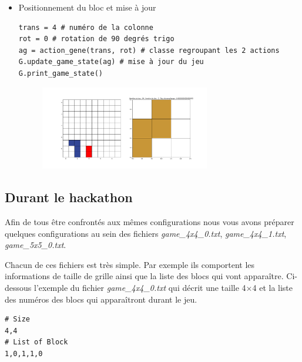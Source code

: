 \documentclass[10pt,a4paper]{article}
\begin{document}
\begin{itemize}
\item Positionnement du bloc et mise à jour
\begin{verbatim}
trans = 4 # numéro de la colonne
rot = 0 # rotation de 90 degrés trigo
ag = action_gene(trans, rot) # classe regroupant les 2 actions
G.update_game_state(ag) # mise à jour du jeu
G.print_game_state()
\end{verbatim}
\begin{figure}[ht!]
	\centering
	\includegraphics[width=0.7\textwidth]{update_game_2.pdf}
\end{figure}

\end{itemize}

\subsection*{Durant le hackathon}

Afin de tous être confrontés aux mêmes configurations nous vous avons préparer quelques configurations au sein des fichiers \textit{game\_4x4\_0.txt}, \textit{game\_4x4\_1.txt}, \textit{game\_5x5\_0.txt}.

Chacun de ces fichiers est très simple. Par exemple ils comportent les informations de taille de grille ainsi que la liste des blocs qui vont apparaître. Ci-dessous l'exemple du fichier \textit{game\_4x4\_0.txt} qui décrit une taille 4$\times$4 et la liste des numéros des blocs qui apparaîtront durant le jeu.
\begin{verbatim}
# Size
4,4
# List of Block
1,0,1,1,0
\end{verbatim}
\end{document}
